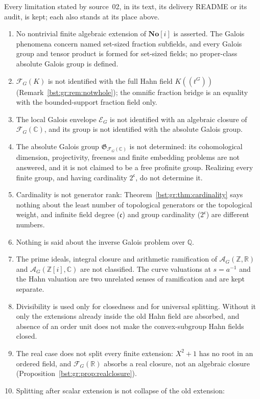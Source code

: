 \documentclass[11pt,letterpaper]{article}
\theoremstyle{definition}
\theoremstyle{remark}
\newcommand{\Q}{\mathbb Q}
\newcommand{\R}{\mathbb R}
\newcommand{\C}{\mathbb C}
\newcommand{\Z}{\mathbb Z}
\newcommand{\No}{\mathbf{No}}
\newcommand{\HH}[2]{#1((t^{#2}))}
\newcommand{\FF}[2]{\mathcal F_{#2}(#1)}
\newcommand{\cc}{\mathfrak c}
\newcommand{\AbsGal}[1]{\mathfrak G_{#1}}
\newcommand{\AAG}[3]{\mathcal A_{#3}(#1,#2)}
\begin{document}
Every limitation stated by source~02, in its text, its delivery README or its
audit, is kept; each also stands at its place above.
\begin{enumerate}
\item No nontrivial finite algebraic extension of $\No[i]$ is asserted. The
Galois phenomena concern named set-sized fraction subfields, and every Galois
group and tensor product is formed for set-sized fields; no proper-class
absolute Galois group is defined.
\item $\FF KG$ is not identified with the full Hahn field $\HH KG$
(Remark~\ref{bst:gr:rem:notwhole}); the omnific fraction bridge is an equality
with the bounded-support fraction field only.
\item The local Galois envelope $\mathcal E_G$ is not identified with an
algebraic closure of $\FF{\C}G$, and its group is not identified with the
absolute Galois group.
\item The absolute Galois group $\AbsGal{\FF{\C}G}$ is not determined: its
cohomological dimension, projectivity, freeness and finite embedding problems
are not answered, and it is not claimed to be a free profinite group.
Realizing every finite group, and having cardinality $2^{\cc}$, do not
determine it.
\item Cardinality is not generator rank: Theorem~\ref{bst:gr:thm:cardinality}
says nothing about the least number of topological generators or the
topological weight, and infinite field degree ($\cc$) and group cardinality
($2^{\cc}$) are different numbers.
\item Nothing is said about the inverse Galois problem over $\Q$.
\item The prime ideals, integral closure and arithmetic ramification of
$\AAG{\Z}{\R}G$ and $\AAG{\Z[i]}{\C}G$ are not classified. The curve
valuations at $s=a^{-1}$ and the Hahn valuation are two unrelated senses of
ramification and are kept separate.
\item Divisibility is used only for closedness and for universal splitting.
Without it only the extensions already inside the old Hahn field are
absorbed, and absence of an order unit does not make the convex-subgroup Hahn
fields closed.
\item The real case does not split every finite extension: $X^2+1$ has no root
in an ordered field, and $\FF{\R}G$ absorbs a real closure, not an algebraic
closure (Proposition~\ref{bst:gr:prop:realclosure}).
\item Splitting after scalar extension is not collapse of the old extension:

\end{enumerate}
\end{document}
